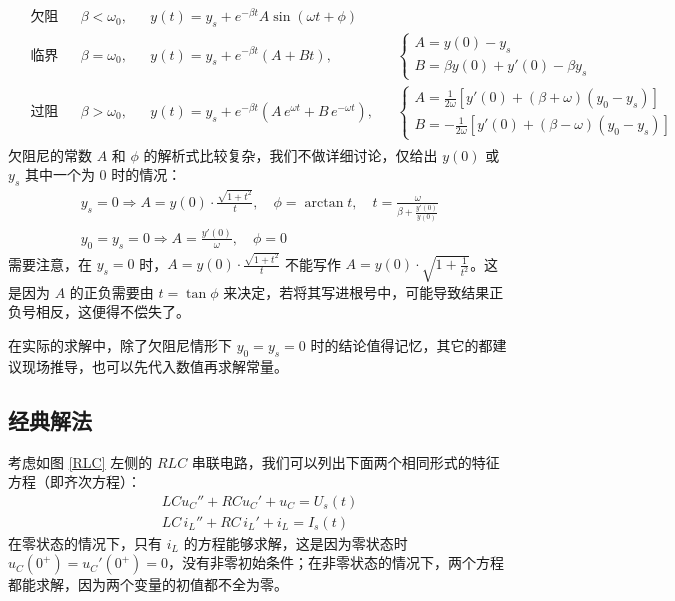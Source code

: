 \documentclass[UTF8]{report}
\theoremstyle{MyLineTheoremStyle} %
\theoremstyle{MyBlockTheoremStyle} %
\theoremstyle{MySubsubsectionStyle} %
\begin{document}
\begin{gather}
    \begin{aligned}
        &\text{欠阻尼：} &&\beta < \omega_0, &&y(t) = y_s +  e^{-\beta t} A\sin \left( \omega t + \phi \right) 
        \\ 
        &\text{临界阻尼：} &&\beta = \omega_0, &&y(t) = y_s +  e^{-\beta t} (A + Bt),&&
        \begin{cases}
            A = y(0) - y_s \\
            B = \beta y(0) + y'(0) - \beta y_s
        \end{cases} \\
        &\text{过阻尼：} &&\beta > \omega_0, &&y(t) = y_s +  e^{-\beta t}\left( A\,e^{\omega t} + B\,e^{-\omega t}\right),&&
        \begin{cases}
            A = \frac{1}{2 \omega} \left[ y'(0) + (\beta + \omega)(y_0 - y_s) \right] \\ 
            B = - \frac{1}{2 \omega} \left[ y'(0) + (\beta - \omega)(y_0 - y_s) \right]
        \end{cases}
    \end{aligned}
\end{gather}
欠阻尼的常数 $A$ 和 $\phi$ 的解析式比较复杂，我们不做详细讨论，仅给出 $y(0)$ 或 $y_s$ 其中一个为 0 时的情况：
\begin{gather}
    y_s = 0 \Longrightarrow 
    A = y(0)\cdot \frac{\sqrt{1 + t^2}}{t},\quad \phi = \arctan t ,\quad t = \frac{\omega}{\beta + \frac{y'(0)}{y(0)}}
    \\
    y_0 = y_s = 0 \Longrightarrow
    A = \frac{y'(0)}{\omega},\quad \phi = 0
\end{gather}
需要注意，在 $y_s = 0$ 时，$A = y(0)\cdot \frac{\sqrt{1 + t^2}}{t}$ 不能写作 $A = y(0)\cdot \sqrt{1 + \frac{1}{t^2}}$。这是因为 $A$ 的正负需要由 $t = \tan \phi$ 来决定，若将其写进根号中，可能导致结果正负号相反，这便得不偿失了。

在实际的求解中，除了欠阻尼情形下 $y_0 = y_s = 0$ 时的结论值得记忆，其它的都建议现场推导，也可以先代入数值再求解常量。

\subsection{经典解法}
考虑如图 \ref{RLC} 左侧的 $RLC$ 串联电路，我们可以列出下面两个相同形式的特征方程（即齐次方程）：
\begin{gather}
    LC u_C'' + RC u_C' + u_C = U_s(t) \\
    LC\, i_L'' + RC\, i_L' + i_L = I_s(t)
\end{gather}
在零状态的情况下，只有 $i_L$ 的方程能够求解，这是因为零状态时 $u_C(0^+) = u_C'(0^+) = 0$，没有非零初始条件；在非零状态的情况下，两个方程都能求解，因为两个变量的初值都不全为零。
\end{document}
